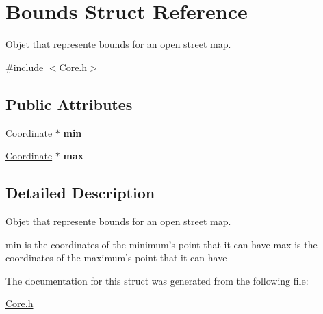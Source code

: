 \hypertarget{structBounds}{\section{Bounds Struct Reference}
\label{structBounds}
}


Objet that represente bounds for an open street map.  




{\ttfamily \#include $<$Core.\-h$>$}

\subsection*{Public Attributes}
\begin{DoxyCompactItemize}
\item 
\hypertarget{structBounds_a1c9164048f1f4c69c95fe140ade0b356}{\hyperlink{structCoordinate}{Coordinate} $\ast$ {\bfseries min}}\label{structBounds_a1c9164048f1f4c69c95fe140ade0b356}

\item 
\hypertarget{structBounds_a78e28f17202532fe18c6d05cc155c791}{\hyperlink{structCoordinate}{Coordinate} $\ast$ {\bfseries max}}\label{structBounds_a78e28f17202532fe18c6d05cc155c791}

\end{DoxyCompactItemize}


\subsection{Detailed Description}
Objet that represente bounds for an open street map. 

min is the coordinates of the minimum's point that it can have max is the coordinates of the maximum's point that it can have 

The documentation for this struct was generated from the following file\-:\begin{DoxyCompactItemize}
\item 
\hyperlink{Core_8h}{Core.\-h}\end{DoxyCompactItemize}
